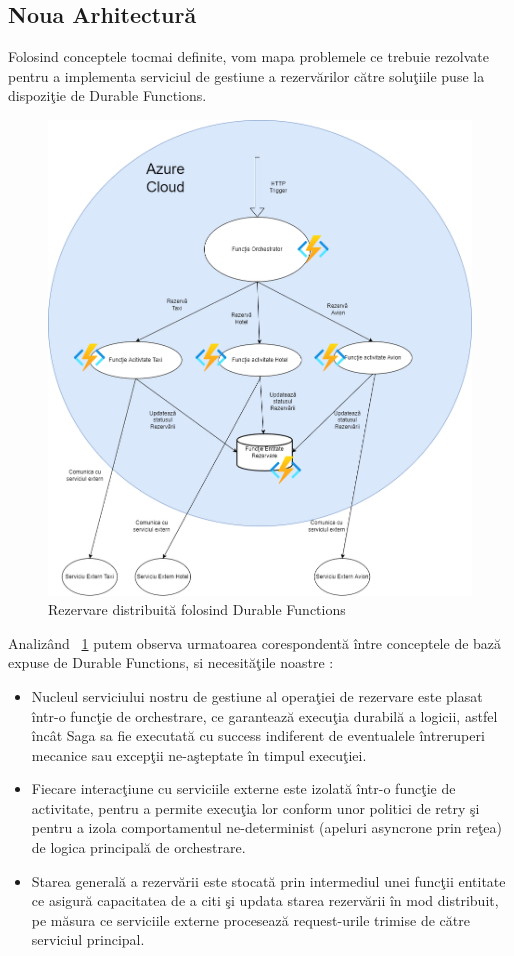 \subsection{Noua Arhitectură}
\par Folosind conceptele tocmai definite, vom mapa problemele ce trebuie rezolvate pentru a implementa serviciul de gestiune a rezervărilor către soluţiile puse la dispoziţie de Durable Functions. 
 \begin{figure}[h]
\centering
        \includegraphics[width=1\textwidth]{images/durable_functions_arhitecture}
			 \caption{Rezervare distribuită folosind Durable Functions}
			 \label{fig:durable-functions-booking-arhitecture}
\end{figure}
 \par Analizând ~\ref{fig:durable-functions-booking-arhitecture} putem observa urmatoarea corespondentă între conceptele de bază expuse de Durable Functions, si necesităţile noastre : 
 \begin{itemize}
 \item Nucleul serviciului nostru de gestiune al operaţiei de rezervare este plasat într-o funcţie de orchestrare, ce garantează execuţia durabilă a logicii, astfel încât Saga sa fie executată cu success indiferent de eventualele întreruperi mecanice sau excepţii ne-aşteptate în timpul execuţiei.
 \item Fiecare interacţiune cu serviciile externe este izolată într-o funcţie de activitate, pentru a permite execuţia lor conform unor politici de retry şi pentru a izola comportamentul ne-determinist (apeluri asyncrone prin reţea) de logica principală de orchestrare.
 \item Starea generală a rezervării este stocată prin intermediul unei funcţii entitate ce asigură capacitatea de a citi şi updata starea rezervării în mod distribuit, pe măsura ce serviciile externe procesează request-urile trimise de către serviciul principal.
 \end{itemize}
